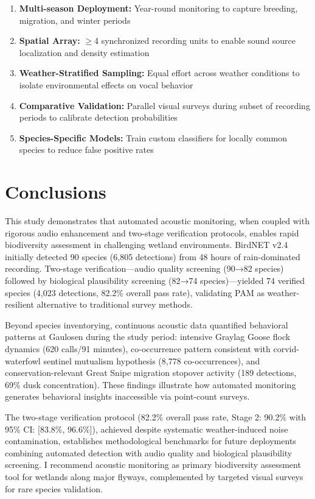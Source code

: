 \documentclass[twocolumn]{article}
\begin{document}
\begin{enumerate}
\item \textbf{Multi-season Deployment:} Year-round monitoring to capture breeding, migration, and winter periods

\item \textbf{Spatial Array:} $\geq$4 synchronized recording units to enable sound source localization and density estimation

\item \textbf{Weather-Stratified Sampling:} Equal effort across weather conditions to isolate environmental effects on vocal behavior

\item \textbf{Comparative Validation:} Parallel visual surveys during subset of recording periods to calibrate detection probabilities

\item \textbf{Species-Specific Models:} Train custom classifiers for locally common species to reduce false positive rates
\end{enumerate}

\section{Conclusions}

This study demonstrates that automated acoustic monitoring, when coupled with rigorous audio enhancement and two-stage verification protocols, enables rapid biodiversity assessment in challenging wetland environments. BirdNET v2.4 initially detected 90 species (6,805 detections) from 48 hours of rain-dominated recording. Two-stage verification—audio quality screening (90→82 species) followed by biological plausibility screening (82→74 species)—yielded 74 verified species (4,023 detections, 82.2\% overall pass rate), validating PAM as weather-resilient alternative to traditional survey methods.

Beyond species inventorying, continuous acoustic data quantified behavioral patterns at Gaulosen during the study period: intensive Graylag Goose flock dynamics (620 calls/91 minutes), co-occurrence pattern consistent with corvid-waterfowl sentinel mutualism hypothesis (8,778 co-occurrences), and conservation-relevant Great Snipe migration stopover activity (189 detections, 69\% dusk concentration). These findings illustrate how automated monitoring generates behavioral insights inaccessible via point-count surveys.

The two-stage verification protocol (82.2\% overall pass rate, Stage 2: 90.2\% with 95\% CI: [83.8\%, 96.6\%]), achieved despite systematic weather-induced noise contamination, establishes methodological benchmarks for future deployments combining automated detection with audio quality and biological plausibility screening. I recommend acoustic monitoring as primary biodiversity assessment tool for wetlands along major flyways, complemented by targeted visual surveys for rare species validation.
\end{document}
